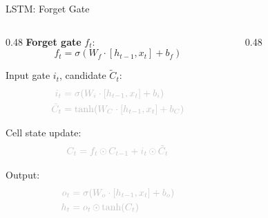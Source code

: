 \begin{frame}{LSTM: Forget Gate}
  \begin{columns}[T]
    \begin{column}{0.48\textwidth}
      \textbf{Forget gate} $f_t$:
      \[
        f_t = \sigma\!\left(W_f \cdot [h_{t-1}, x_t] + b_f\right)
      \]

      \textcolor{gray!50}{Input gate $i_t$, candidate $\tilde{C}_t$:}
      \[
      \textcolor{gray!50}{
      \begin{aligned}
        i_t &= \sigma\!\left(W_i \cdot [h_{t-1}, x_t] + b_i\right) \\
        \tilde{C}_t &= \tanh\!\left(W_C \cdot [h_{t-1}, x_t] + b_C\right)
      \end{aligned}
      }
      \]

      \textcolor{gray!50}{Cell state update:}
      \[
        \textcolor{gray!50}{C_t = f_t \odot C_{t-1} + i_t \odot \tilde{C}_t}
      \]

      \textcolor{gray!50}{Output:}
      \[
      \textcolor{gray!50}{
      \begin{aligned}
        o_t &= \sigma\!\left(W_o \cdot [h_{t-1}, x_t] + b_o\right) \\
        h_t &= o_t \odot \tanh(C_t)
      \end{aligned}
      }
      \]
    \end{column}
    \begin{column}{0.48\textwidth}
      \begin{center}
      \end{center}
    \end{column}
  \end{columns}
\end{frame}

